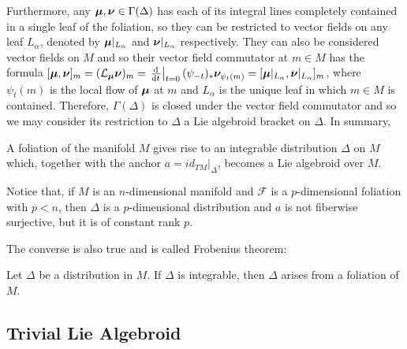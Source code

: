 Furthermore, any $\bm{\mu}, \bm{\nu} \in \Gamma(\Delta)$ has each of its integral lines completely contained in a single leaf of the foliation, so they can be restricted to vector fields on any leaf $L_\alpha$, denoted by $\bm{\mu}|_{L_\alpha}$ and $\bm{\nu}|_{L_\alpha}$ respectively. They can also be considered vector fields on $M$ and so their vector field commutator at $m \in M$ has the formula $[\sect \mu, \sect \nu]_m = (\mathcal L_{\sect \mu} \sect \nu)_m = \der{t}[t = 0] (\psi_{-t})_* \sect \nu_{\psi_t(m)} = [\sect \mu|_{L_\alpha}, \sect \nu|_{L_\alpha}]_m$, where $\psi_t(m)$ is the local flow of $\bm{\mu}$ at $m$ and $L_\alpha$ is the unique leaf in which $m \in M$ is contained. Therefore, $\Gamma(\Delta)$ is closed under the vector field commutator and so we may consider its restriction to $\Delta$ a Lie algebroid bracket on $\Delta$. In summary, 
\begin{proposition}
A foliation of the manifold $M$ gives rise to an integrable distribution $\Delta$ on $M$ which, together with the anchor $a = id_{TM}|_\Delta$, becomes a Lie algebroid over $M$.
\end{proposition}
Notice that, if $M$ is an $n$-dimensional manifold and $\mathcal F$ is a $p$-dimensional foliation with $p < n$, then $\Delta$ is a $p$-dimensional distribution and $a$ is not fiberwise surjective, but it is of constant rank $p$.

The converse is also true and is called Frobenius theorem:

\begin{proposition}
Let $\Delta$ be a distribution in $M$. If $\Delta$ is integrable, then $\Delta$ arises from a foliation of $M$.
\end{proposition}



\subsection{Trivial Lie Algebroid}

